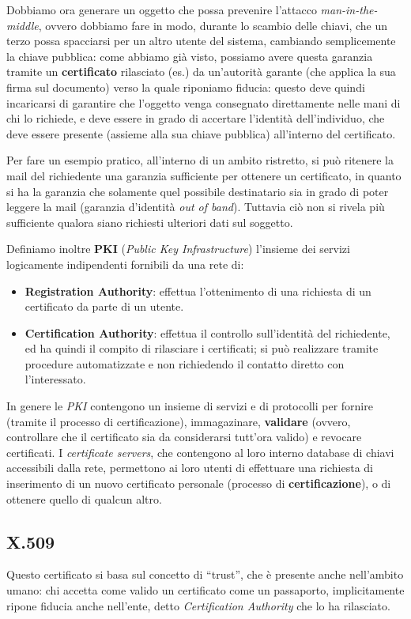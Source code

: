 Dobbiamo ora generare un oggetto che possa prevenire l'attacco \textit{man-in-the-middle},
ovvero dobbiamo fare in modo, durante lo scambio delle chiavi, che un terzo 
possa spacciarsi per un altro utente del sistema, cambiando semplicemente la 
chiave pubblica: come abbiamo già visto, possiamo avere questa garanzia tramite un
\textbf{certificato} rilasciato (es.) da un'autorità garante (che applica la sua 
firma sul documento) verso la quale riponiamo
fiducia: questo deve quindi incaricarsi di garantire che l'oggetto venga
consegnato direttamente nelle mani di chi lo richiede, e deve essere in grado
di accertare l'identità dell'individuo, che deve essere presente (assieme alla
sua chiave pubblica) all'interno del certificato. 


Per fare un esempio pratico, all'interno di un ambito ristretto, si può ritenere
la mail del richiedente una garanzia sufficiente per ottenere un certificato,
in quanto si ha la garanzia che solamente quel possibile destinatario sia in 
grado di poter leggere la mail (garanzia d'identità \textit{out of band}). Tuttavia
ciò non si rivela più sufficiente qualora siano richiesti ulteriori dati sul 
soggetto.
\medskip

Definiamo inoltre \textbf{ PKI} (\textit{Public Key Infrastructure}) l'insieme dei servizi
logicamente indipendenti fornibili da una rete di:
\begin{itemize}
\item \textbf{Registration Authority}: effettua l'ottenimento di una richiesta di un
	certificato da parte di un utente.
\item \textbf{Certification Authority}: effettua il controllo sull'identità 
	del richiedente, ed ha quindi il compito di rilasciare i certificati; 
	si può realizzare tramite procedure automatizzate
	e non richiedendo il contatto diretto con l'interessato.
\end{itemize}
In genere le \textit{PKI} contengono un insieme di servizi e di protocolli per
fornire (tramite il processo di certificazione), immagazinare, \textbf{validare} 
(ovvero, controllare che il certificato sia da considerarsi tutt'ora valido)
e revocare certificati. 
I \textit{certificate servers}, che contengono al loro interno database di chiavi
accessibili dalla rete, permettono ai loro utenti di effettuare una richiesta
di inserimento di un nuovo certificato personale (processo di \textbf{certificazione}), 
o di ottenere quello di qualcun altro. 

\subsection {X.509}
Questo certificato si basa sul concetto di ``trust'', che è presente anche 
nell'ambito umano: chi accetta come valido un certificato come un passaporto,
implicitamente ripone fiducia anche nell'ente, detto \textit{Certification Authority} 
che lo ha rilasciato. 


